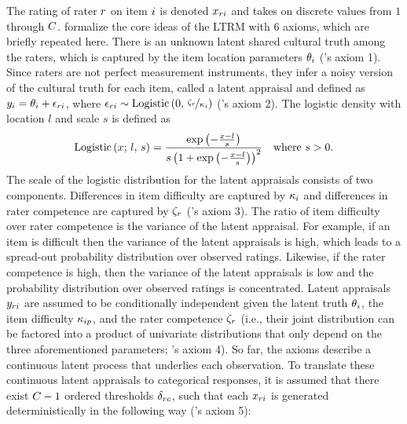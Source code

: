 \documentclass[a4paper,usenames,dvipsnames]{article}
\newenvironment{revision}{\color{teal}}{\color{black}}
\begin{document}
The rating of rater $r$ on item $i$ is denoted $x_{ri}$ and takes on discrete values from $1$ through $\Tncat$. \AB{} formalize the core ideas of the LTRM with 6 axioms, which are briefly repeated here. There is an unknown latent shared cultural truth among the raters, which is captured by the item location parameters $\theta_i$ (\AB{}'s axiom 1). Since raters are not perfect measurement instruments, they infer a noisy version of the cultural truth for each item, called a latent appraisal and defined as $y_{i} = \theta_i + \epsilon_{ri}$, where $\epsilon_{ri}\sim \text{Logistic}\left(0,\,\nicefrac{\zeta_r}{\kappa_i}\right)$ (\AB{}'s axiom 2). The logistic density \begin{revision}with location $l$ and scale $s$\end{revision} is defined as
\begin{align*}
	\text{Logistic}\left(x;\,l,\,s\right) = \frac{\exp\left(-\frac{x - l}{s}\right)}{s\left(1 + \exp\left(-\frac{x - l}{s}\right)\right)^2}
	\quad \text{where $s > 0$}.
\end{align*}
The scale of the logistic distribution for the latent appraisals consists of two components. Differences in item difficulty are captured by $\kappa_i$ and differences in rater competence are captured by $\zeta_r$ (\AB{}'s axiom 3). The ratio of item difficulty over rater competence is the variance of the latent appraisal. For example, if an item is difficult then the variance of the latent appraisals is high, which leads to a spread-out probability distribution over observed ratings. Likewise, if the rater competence is high, then the variance of the latent appraisals is low and the probability distribution over observed ratings is concentrated. Latent appraisals $y_{ri}$ are assumed to be conditionally independent given the latent truth $\theta{}_i$, the item difficulty $\kappa_{ip}$, and the rater competence $\zeta_r$ (i.e., their joint distribution can be factored into a product of univariate distributions that only depend on the three aforementioned parameters; \AB{}'s axiom 4). So far, the axioms describe a continuous latent process that underlies each observation. To translate these continuous latent appraisals to categorical responses, it is assumed that there exist $\Tncat - 1$ ordered thresholds $\delta_{rc}$, such that each $x_{ri}$ is generated deterministically in the following way (\AB{}'s axiom 5):
\end{document}
